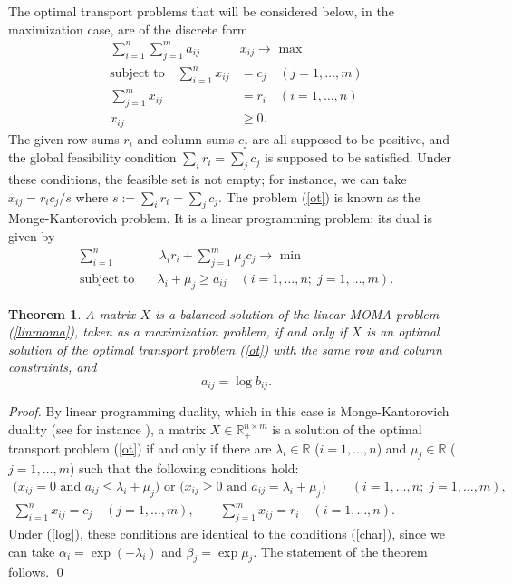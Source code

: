 \documentclass{article}
\newcommand{\mR}{\mathbb{R}}
\newcommand{\ed}[1]{{\rm #1}}
\newtheorem{theorem}{Theorem}[section]
\theoremstyle{definition}
\begin{document}
The optimal transport problems that will be considered below, in the maximization case, are of the discrete form
\begin{subequations} \label{ot}
\begin{align}
\sum_{i=1}^n \sum_{j=1}^m a_{ij}& x_{ij} \rightarrow \text{ max} \\
\text{subject to} \quad \sum_{i=1}^n x_{ij} & = c_j \quad (j = 1,\dots,m) \\
\sum_{j=1}^m x_{ij} & = r_i \quad (i = 1,\dots,n) \\
x_{ij} & \geq 0.
\end{align}
\end{subequations}
The given row sums $r_i$ and column sums $c_j$ are all supposed to be positive, and the global feasibility condition $\sum_i r_i = \sum_j c_j$ is supposed to be satisfied. Under these conditions, the feasible set is not empty; for instance, we can take $x_{ij} = r_ic_j/s$ where $s:= \sum_i r_i = \sum_j c_j$.
The problem (\ref{ot}) is known as the Monge-Kantorovich problem. It is a linear programming problem; its dual is given by
\begin{subequations}
\begin{align}
\sum_{i=1}^n &\, \lambda_i r_i + \sum_{j=1}^m \mu_j c_j \rightarrow \text{ min} \\
\text{subject to} \quad & \lambda_i + \mu_j \geq a_{ij} \quad (i = 1,\dots,n; \; j = 1,\dots,m).
\end{align}
\end{subequations}
\begin{theorem}
A matrix $X$ is a balanced solution of the linear \ed{MOMA} problem \ed{(\ref{linmoma})}, taken as a maximization problem, if and only if $X$ is an optimal solution of the optimal transport problem \ed{(\ref{ot})} with the same row and column constraints, and
\begin{equation} \label{log}
a_{ij} = \log b_{ij}.
\end{equation}
\end{theorem}

\begin{proof}
By linear programming duality, which in this case is Monge-Kantorovich duality (see for instance \cite[Thm.\,2.2]{Galichon}), a matrix $X \in \mR^{n \times m}_+$ is a solution of the optimal transport problem (\ref{ot}) if and only if there are $\lambda_i \in \mR$ ($i = 1,\dots,n$) and $\mu_j \in \mR$ ($j=1,\dots,m$) such that the following conditions hold:
\begin{multline}
\big(x_{ij}=0 \text{ and } a_{ij} \leq \lambda_i + \mu_j\big)
\text{ or } \big(x_{ij} \geq 0 \text{ and } a_{ij} = \lambda_i + \mu_j\big) \qquad (i=1,\dots,n;\; j = 1,\dots,m), \\
\sum_{i=1}^n x_{ij} = c_j \quad (j=1,\dots,m), \qquad
\sum_{j=1}^m x_{ij} = r_i \quad (i=1,\dots,n). \hspace{2cm}
\end{multline}
Under (\ref{log}), these conditions are identical to the conditions (\ref{char}), since we can take $\alpha_i = \exp(-\lambda_i)$ and $\beta_j = \exp \mu_j$. The statement of the theorem follows.
\qed
\end{proof}
\end{document}
